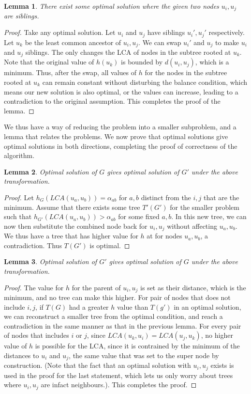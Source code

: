 \documentclass{article}
\newtheorem{lemma}{Lemma}
\begin{document}
\begin{lemma}
	There exist some optimal solution where the given two nodes $u_{i}, u_{j}$ are siblings.
\end{lemma}
\begin{proof}
	Take any optimal solution.
	Let $u_{i}$ and $u_{j}$ have siblings $u_{i}', u_{j}'$ respectively.
	Let $u_{k}$ be the least common ancestor of $u_{i}, u_{j}$.
	We can swap $u_{i}'$ and $u_{j}$ to make $u_{i}$ and $u_{j}$ siblings.
	The only changes the LCA of nodes in the subtree rooted at $u_{k}$.
	Note that the original value of $h(u_{k})$ is bounded by $d(u_{i}, u_{j})$, which is a minimum.
	Thus, after the swap, all values of $h$ for the nodes in the subtree rooted at $u_{k}$ can remain constant without disturbing the balance condition, which means our new solution is also optimal, or the values can increase, leading to a contradiction to the original assumption.
	This completes the proof of the lemma.
\end{proof}

We thus have a way of reducing the problem into a smaller subproblem, and a lemma that relates the problems.
We now prove that optimal solutions give optimal solutions in both directions, completing the proof of correctness of the algorithm.
\begin{lemma}
	Optimal solution of $G$ gives optimal solution of $G'$ under the above transformation.
\end{lemma}
\begin{proof}
	Let $h_{G}(LCA(u_{a}, u_{b})) = \alpha_{ab}$ for $a, b$ distinct from the $i, j$ that are the minimum.
	Assume that there exists some tree $T'(G')$ for the smaller problem such that $h_{G'}(LCA(u_{a}, u_{b})) > \alpha_{ab}$ for some fixed $a, b$.
	In this new tree, we can now then substitute the combined node back for $u_{i}, u_{j}$ without affecting $u_{a}, u_{b}$.
	We thus have a tree that has higher value for $h$ at for nodes $u_{a}, u_{b}$, a contradiction.
	Thus $T(G')$ is optimal.
\end{proof}
\begin{lemma}
	Optimal solution of $G'$ gives optimal solution of $G$ under the above transformation.
\end{lemma}
\begin{proof}
	The value for $h$ for the parent of $u_{i}, u_{j}$ is set as their distance, which is the minimum, and no tree can make this higher.
	For pair of nodes that does not include $i, j$, if $T(G)$ had a greater $h$ value than $T(g')$ in an optimal solution, we can reconstruct a smaller tree from the optimal condition, and reach a contradiction in the same manner as that in the previous lemma.
	For every pair of nodes that includes $i$ or $j$, since $LCA(u_{k}, u_{i}) = LCA(u_{j}, u_{k})$, no higher value of $h$ is possible for the LCA, since it is contrained by the minimum of the distances to $u_{i}$ and $u_{j}$, the same value that was set to the super node by construction. (Note that the fact that an optimal solution with $u_{i}, u_{j}$ exists is used in the proof for the last statement, which lets us only worry about trees where $u_{i}, u_{j}$ are infact neighbours.).
	This completes the proof.
\end{proof}
\end{document}
